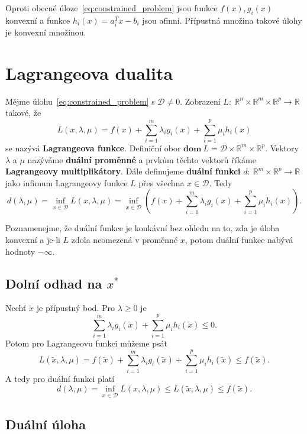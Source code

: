 Oproti obecné úloze~\ref{eq:constrained_problem} jsou funkce $f(x), g_i(x)$ konvexní a funkce $h_i(x) = a_i^Tx - b_i$ jsou afinní. Přípustná množina takové úlohy je konvexní množinou.

\section{Lagrangeova dualita}

Mějme úlohu~\ref{eq:constrained_problem} s $\mathcal{D} \neq 0$. Zobrazení $L:\ \mathbb{R}^n \times \mathbb{R}^m \times \mathbb{R}^p \rightarrow \mathbb{R}$ takové, že
\begin{equation}
    L(x, \lambda, \mu) = f(x) + \sum_{i=1}^m \lambda_i g_i(x) + \sum_{i=1}^p \mu_i h_i(x)
\end{equation}
se nazývá \textbf{Lagrangeova funkce}. Definiční obor $\textbf{dom}\ L = \mathcal{D} \times \mathbb{R}^m \times \mathbb{R}^p$. Vektory $\lambda$ a $\mu$ nazýváme \textbf{duální proměnné} a prvkům těchto vektorů říkáme \textbf{Lagrangeovy multiplikátory}. Dále definujeme \textbf{duální funkci} $d:\ \mathbb{R}^m \times \mathbb{R}^p \rightarrow \mathbb{R}$ jako infimum Lagrangeovy funkce $L$ přes všechna $x \in \mathcal{D}$. Tedy
\begin{equation}
    d(\lambda, \mu) = \inf_{x \in \mathcal{D}} L(x, \lambda, \mu) = \inf_{x \in \mathcal{D}} \left( f(x) + \sum_{i=1}^m \lambda_i g_i(x) + \sum_{i=1}^p \mu_i h_i(x) \right).
\end{equation}

Poznamenejme, že duální funkce je konkávní bez ohledu na to, zda je úloha konvexní a je-li $L$ zdola neomezená v proměnné $x$, potom duální funkce nabývá hodnoty $-\infty$.

\subsection{Dolní odhad na $x^*$}\label{s:lower_bound}

Nechť $\tilde{x}$ je přípustný bod. Pro $\lambda \geq 0$ je
$$
    \sum_{i=1}^m \lambda_i g_i(\tilde{x}) + \sum_{i=1}^p \mu_i h_i(\tilde{x}) \leq 0.
$$
Potom pro Lagrangeovu funkci můžeme psát
$$
    L(\tilde{x}, \lambda, \mu) = f(\tilde{x}) + \sum_{i=1}^m \lambda_i g_i(\tilde{x}) + \sum_{i=1}^p \mu_i h_i(\tilde{x}) \leq f(\tilde{x}).
$$
A tedy pro duální funkci platí
$$
    d(\lambda, \mu) = \inf_{x \in \mathcal{D}} L(x, \lambda, \mu) \leq L(\tilde{x}, \lambda, \mu) \leq f(\tilde{x}).
$$

\subsection{Duální úloha}

